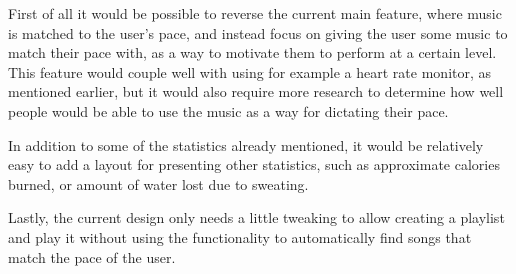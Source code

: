 First of all it would be possible to reverse the current main feature, where music is matched to the user's pace, and instead focus on giving the user some music to match their pace with, as a way to motivate them to perform at a certain level.
This feature would couple well with using for example a heart rate monitor, as mentioned earlier, but it would also require more research to determine how well people would be able to use the music as a way for dictating their pace.

In addition to some of the statistics already mentioned, it would be relatively easy to add a layout for presenting other statistics, such as approximate calories burned, or amount of water lost due to sweating.

Lastly, the current design only needs a little tweaking to allow creating a playlist and play it without using the functionality to automatically find songs that match the pace of the user.










